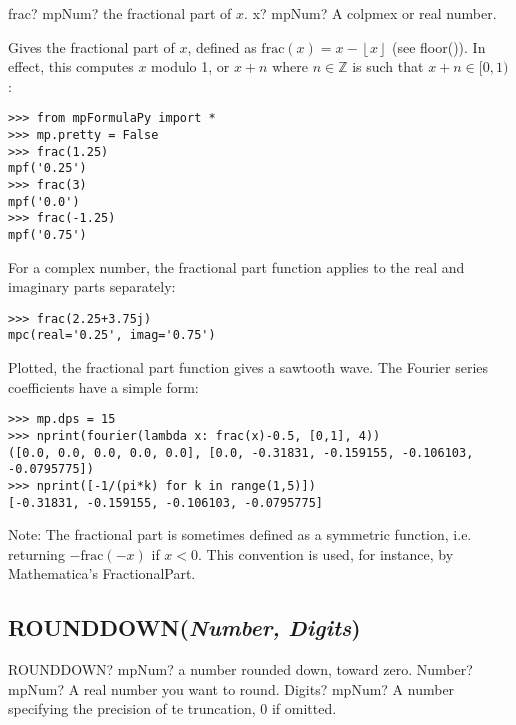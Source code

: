 \begin{mpFunctionsExtract}
	\mpFunctionOne
	{frac? mpNum? the fractional part of $x$.}
	{x? mpNum? A colpmex or real number.}
\end{mpFunctionsExtract}


\vpara
Gives the fractional part of $x$, defined as $\text{frac}(x)=x-\left\lfloor x \right\rfloor$ (see floor()). In effect, this computes $x$ modulo 1, or $x+n$ where $n \in \mathbb{Z}$ is such that $x+n \in [0,1)$:

\begin{lstlisting}
>>> from mpFormulaPy import *
>>> mp.pretty = False
>>> frac(1.25)
mpf('0.25')
>>> frac(3)
mpf('0.0')
>>> frac(-1.25)
mpf('0.75')
\end{lstlisting}


For a complex number, the fractional part function applies to the real and imaginary parts separately:

\begin{lstlisting}
>>> frac(2.25+3.75j)
mpc(real='0.25', imag='0.75')
\end{lstlisting}


Plotted, the fractional part function gives a sawtooth wave. The Fourier series coefficients have a simple form:

\begin{lstlisting}
>>> mp.dps = 15
>>> nprint(fourier(lambda x: frac(x)-0.5, [0,1], 4))
([0.0, 0.0, 0.0, 0.0, 0.0], [0.0, -0.31831, -0.159155, -0.106103, -0.0795775])
>>> nprint([-1/(pi*k) for k in range(1,5)])
[-0.31831, -0.159155, -0.106103, -0.0795775]
\end{lstlisting}


Note: The fractional part is sometimes defined as a symmetric function, i.e. returning $-\text{frac}(-x)$ if $x<0$. This convention is used, for instance, by Mathematica’s FractionalPart.




\subsection{ROUNDDOWN(\textit{Number, Digits})}

\begin{mpFunctionsExtract}
	\mpWorksheetFunctionTwoNotImplemented
	{ROUNDDOWN? mpNum? a number rounded down, toward zero.}
	{Number? mpNum? A real number you want to round.}
	{Digits? mpNum? A number specifying the precision of te truncation, 0 if omitted.}
\end{mpFunctionsExtract}


